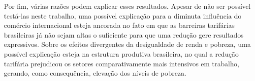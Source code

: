 Por fim, várias razões podem explicar esses resultados. Apesar de não ser possível testá-las neste trabalho, uma possível explicação para a diminuta influência do comércio internacional esteja ancorada no fato em que as barreiras tarifárias brasileiras já não sejam altas o suficiente para que uma redução gere resultados expressivos. Sobre os efeitos divergentes da desigualdade de renda e pobreza, uma possível explicação esteja na estrutura produtiva brasileira, no qual a redução tarifária prejudicou os setores comparativamente mais intensivos em trabalho, gerando, como consequência, elevação dos níveis de pobreza.


